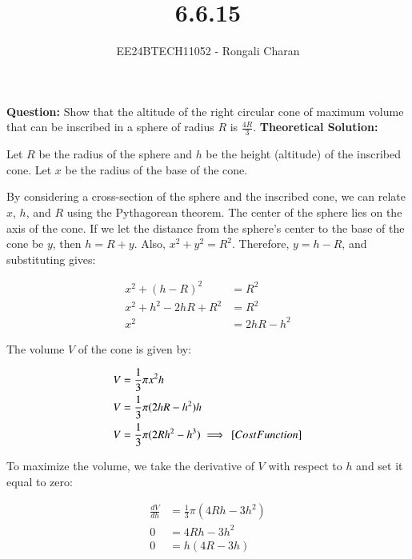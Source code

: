 \documentclass[journal]{IEEEtran}
\begin{document}

\vspace{3cm}

\title{6.6.15}
\author{EE24BTECH11052 - Rongali Charan}
{\let\newpage\relax\maketitle}

\renewcommand{\thefigure}{\theenumi}
\renewcommand{\thetable}{\theenumi}
\setlength{\intextsep}{10pt} %

\textbf{Question:}
\newline
Show that the altitude of the right circular cone of maximum volume that can be inscribed in a sphere of radius $R$ is $\frac{4R}{3}$.
\newline
\textbf{Theoretical Solution:}

Let $R$ be the radius of the sphere and $h$ be the height (altitude) of the inscribed cone. Let $x$ be the radius of the base of the cone.

By considering a cross-section of the sphere and the inscribed cone, we can relate $x$, $h$, and $R$ using the Pythagorean theorem.  The center of the sphere lies on the axis of the cone.  If we let the distance from the sphere's center to the base of the cone be $y$, then $h = R + y$. Also, $x^2 + y^2 = R^2$.  Therefore, $y = h-R$, and substituting gives:

\begin{align}
x^2 + (h-R)^2 &= R^2 \\
x^2 + h^2 - 2hR + R^2 &= R^2 \\
x^2 &= 2hR - h^2
\end{align}

The volume $V$ of the cone is given by:

\begin{align}
V &= \frac{1}{3} \pi x^2 h \\
V &= \frac{1}{3} \pi (2hR - h^2) h \\
	V &= \frac{1}{3} \pi (2Rh^2 - h^3)   \implies {}\left[ Cost Function\right]
\end{align}

To maximize the volume, we take the derivative of $V$ with respect to $h$ and set it equal to zero:

\begin{align}
\frac{dV}{dh} &= \frac{1}{3} \pi (4Rh - 3h^2) \\
0 &= 4Rh - 3h^2 \\
0 &= h(4R - 3h)
\end{align}
\end{document}

